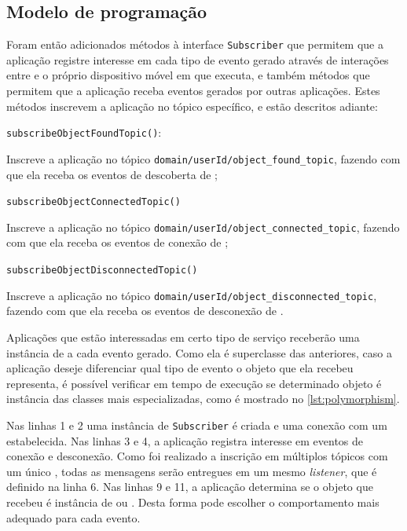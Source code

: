 \subsection{Modelo de programação}

Foram então adicionados métodos à interface \texttt{Subscriber} que permitem que a aplicação registre interesse em cada tipo de evento gerado através de interações entre \smartobjs e o próprio dispositivo móvel em que executa, e também métodos que permitem que a aplicação receba eventos gerados por outras aplicações. Estes métodos inscrevem a aplicação no tópico \mqtt específico, e estão descritos adiante:

\begin{alineas}
	\item \texttt{subscribeObjectFoundTopic()}:
	\begin{alineas}
		\item Inscreve a aplicação no tópico \texttt{domain/userId/object\_found\_topic}, fazendo com que ela receba os eventos de descoberta de \smartobjs;
	\end{alineas}

	\item \texttt{subscribeObjectConnectedTopic()}
	\begin{alineas}
		\item Inscreve a aplicação no tópico \texttt{domain/userId/object\_connected\_topic}, fazendo com que ela receba os eventos de conexão de \smartobjs;
	\end{alineas}

	\item \texttt{subscribeObjectDisconnectedTopic()}
	\begin{alineas}
		\item Inscreve a aplicação no tópico \texttt{domain/userId/object\_disconnected\_topic}, fazendo com que ela receba os eventos de desconexão de \smartobjs.
	\end{alineas}
\end{alineas}


Aplicações que estão interessadas em certo tipo de serviço receberão uma instância de \msg a cada evento gerado.
Como ela é superclasse das anteriores,
caso a aplicação deseje diferenciar qual tipo de evento o objeto \msg que ela recebeu representa, é possível verificar em tempo de execução se determinado objeto é instância das classes mais especializadas, como é mostrado no \autoref{lst:polymorphism}.



Nas linhas 1 e 2 uma instância de \texttt{Subscriber} é criada e uma conexão com um \broker estabelecida.
Nas linhas 3 e 4, a aplicação registra interesse em eventos de conexão e desconexão.
Como foi realizado a inscrição em múltiplos tópicos com um único \sub, todas as mensagens serão entregues em um mesmo \textit{listener}, que é definido na linha 6.
Nas linhas 9 e 11, a aplicação determina se o objeto que recebeu é instância de \objconnectedmsg ou \objdisconnectedmsg.
Desta forma pode escolher o comportamento mais adequado para cada evento.

